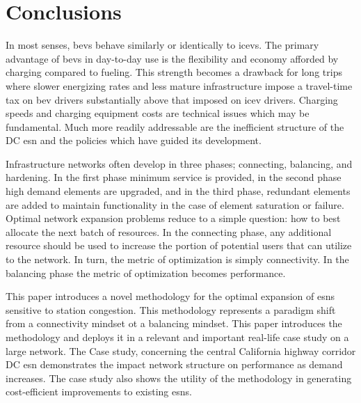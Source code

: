 \section{Conclusions}

In most senses, \glspl{bev} behave similarly or identically to \glspl{icev}. The primary advantage of \glspl{bev} in day-to-day use is the flexibility and economy afforded by charging compared to fueling. This strength becomes a drawback for long trips where slower energizing rates and less mature infrastructure impose a travel-time tax on \gls{bev} drivers substantially above that imposed on \gls{icev} drivers. Charging speeds and charging equipment costs are technical issues which may be fundamental. Much more readily addressable are the inefficient structure of the DC \gls{esn} and the policies which have guided its development.

Infrastructure networks often develop in three phases; connecting, balancing, and hardening. In the first phase minimum service is provided, in the second phase high demand elements are upgraded, and in the third phase, redundant elements are added to maintain functionality in the case of element saturation or failure. Optimal network expansion problems reduce to a simple question: how to best allocate the next batch of resources. In the connecting phase, any additional resource should be used to increase the portion of potential users that can utilize to the network. In turn, the metric of optimization is simply connectivity. In the balancing phase the metric of optimization becomes performance.

This paper introduces a novel methodology for the optimal expansion of \glspl{esn} sensitive to station congestion. This methodology represents a paradigm shift from a connectivity mindset ot a balancing mindset. This paper introduces the methodology and deploys it in a relevant and important real-life case study on a large network. The Case study, concerning the central California highway corridor DC \gls{esn} demonstrates the impact network structure on performance as demand increases. The case study also shows the utility of the methodology in generating cost-efficient improvements to existing \glspl{esn}. 